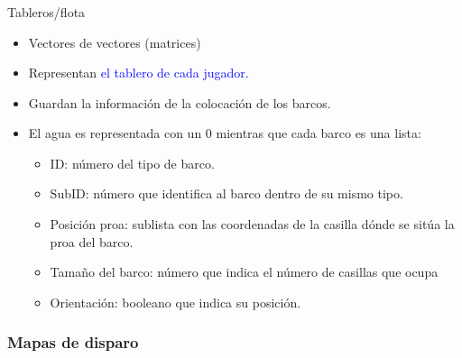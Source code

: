 \begin{frame}
    \frametitle{\insertsection}
    \framesubtitle{\hskip30pt \insertsubsection}

    \begin{block}{Tableros/flota}
        \begin{itemize}
            \item Vectores de vectores (matrices)
            \item Representan \textcolor{blue}{el tablero de cada jugador.}
            \item Guardan la información de la colocación de los barcos. 
            \item El agua es representada con un 0 mientras que cada barco es una lista:
            \begin{itemize}
                \item ID: número del tipo de barco.
                \item SubID: número que identifica al barco dentro de su mismo tipo.
                \item Posición proa: sublista con las coordenadas de la casilla dónde se sitúa la proa del barco.
                \item Tamaño del barco: número que indica el número de casillas que ocupa
                \item Orientación: booleano que indica su posición.
            \end{itemize}
        \end{itemize}
    \end{block}
\end{frame}


\subsubsection{Mapas de disparo}

